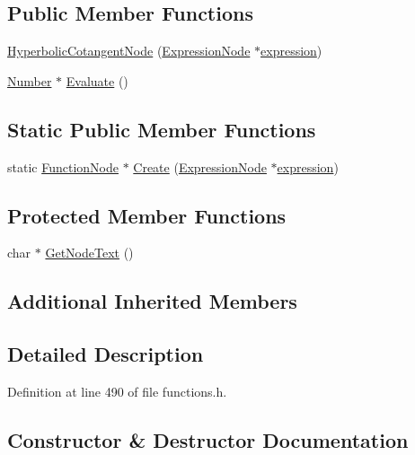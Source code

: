 \subsection*{Public Member Functions}
\begin{DoxyCompactItemize}
\item 
\hyperlink{classHyperbolicCotangentNode_a10ec2c243e9572bc4ae3ac43ab654822}{Hyperbolic\+Cotangent\+Node} (\hyperlink{classExpressionNode}{Expression\+Node} $\ast$\hyperlink{classFunctionNode_ad7577b179a1937aaf8a0058bb5b546dc}{expression})
\item 
\hyperlink{structNumber}{Number} $\ast$ \hyperlink{classHyperbolicCotangentNode_a399d6bc7f6cb8b8b07b5a55f54c47aef}{Evaluate} ()
\end{DoxyCompactItemize}
\subsection*{Static Public Member Functions}
\begin{DoxyCompactItemize}
\item 
static \hyperlink{classFunctionNode}{Function\+Node} $\ast$ \hyperlink{classHyperbolicCotangentNode_aae6696fb8049c3b34d9389e81e583697}{Create} (\hyperlink{classExpressionNode}{Expression\+Node} $\ast$\hyperlink{classFunctionNode_ad7577b179a1937aaf8a0058bb5b546dc}{expression})
\end{DoxyCompactItemize}
\subsection*{Protected Member Functions}
\begin{DoxyCompactItemize}
\item 
char $\ast$ \hyperlink{classHyperbolicCotangentNode_a488a6f668cd2870e3715d478457267f9}{Get\+Node\+Text} ()
\end{DoxyCompactItemize}
\subsection*{Additional Inherited Members}


\subsection{Detailed Description}


Definition at line 490 of file functions.\+h.



\subsection{Constructor \& Destructor Documentation}
